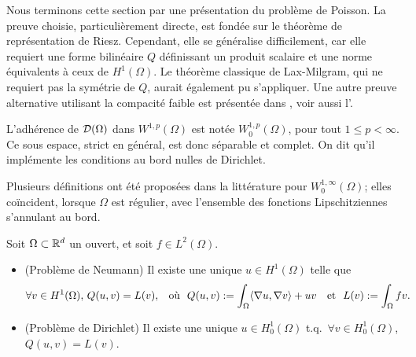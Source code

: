 Nous terminons cette section par une présentation du problème de Poisson. La preuve choisie, particulièrement directe, est fondée sur le théorème de représentation de Riesz.
Cependant, elle se généralise difficilement, car elle requiert une forme bilinéaire $Q$ définissant un produit scalaire et une norme équivalents à ceux de $H^1(\Omega)$. 
Le théorème classique de Lax-Milgram, qui ne requiert pas la symétrie de $Q$, aurait également pu s'appliquer.
Une autre preuve alternative utilisant la compacité faible est présentée dans \cite{desvilettes2015analyse}, voir aussi l'. 


\begin{remark}
\label{rem:bcDirichlet}
%
L'adhérence de $\mathcal{D}(\Omega)$ dans $W^{1,p}(\Omega)$ est notée $W^{1,p}_0(\Omega)$, pour tout $1 \leq p < \infty$. Ce sous espace, strict en général, est donc séparable et complet. On dit qu'il implémente les conditions au bord nulles de Dirichlet.
\end{remark}

Plusieurs définitions ont été proposées dans la littérature pour $W^{1,\infty}_0(\Omega)$; elles coïncident, lorsque $\Omega$ est régulier, avec l'ensemble des fonctions Lipschitziennes s'annulant au bord. 

\begin{theorem} %
\label{th:pbPoisson}
%
Soit $\Omega \subset \mathbb{R}^d$ un ouvert, et soit $f \in L^2(\Omega)$. %
\begin{itemize}
	\item (Problème de Neumann)
Il existe une unique $u \in H^1(\Omega)$ telle que 
\begin{align*}
	\forall v \in H^1(\Omega),\, Q(u,v) &= L(v), &
	\text{où }\
	Q(u,v) &:= \int_\Omega \langle\nabla u,\nabla v\rangle + u v &
	\text{et }\ L(v) &:= \int_\Omega f v.
\end{align*}
\item (Problème de Dirichlet) Il existe une unique $u \in H^1_0(\Omega)$ t.q.\ $\forall v \in H^1_0(\Omega)$, $Q(u,v)=L(v)$. 
\end{itemize}
\end{theorem}


